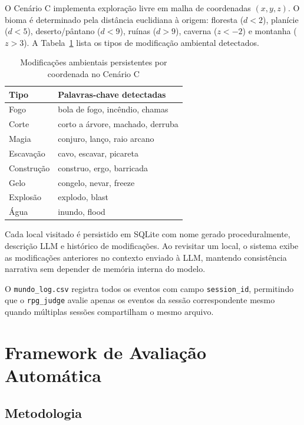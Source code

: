 \documentclass[12pt]{article}
\begin{document}
O Cenário C implementa exploração livre em malha de coordenadas $(x,y,z)$. O bioma é determinado pela distância euclidiana à origem: floresta ($d<2$), planície ($d<5$), deserto/pântano ($d<9$), ruínas ($d>9$), caverna ($z<-2$) e montanha ($z>3$). A Tabela~\ref{tab:modificacoes} lista os tipos de modificação ambiental detectados.

\begin{table}[ht]
\centering
\caption{Modificações ambientais persistentes por coordenada no Cenário C}
\label{tab:modificacoes}
\begin{tabular}{ll}
\toprule
\textbf{Tipo} & \textbf{Palavras-chave detectadas} \\
\midrule
Fogo       & bola de fogo, incêndio, chamas \\
Corte      & corto a árvore, machado, derruba \\
Magia      & conjuro, lanço, raio arcano \\
Escavação  & cavo, escavar, picareta \\
Construção & construo, ergo, barricada \\
Gelo       & congelo, nevar, freeze \\
Explosão   & explodo, blast \\
Água       & inundo, flood \\
\bottomrule
\end{tabular}
\end{table}

Cada local visitado é persistido em SQLite com nome gerado proceduralmente, descrição LLM e histórico de modificações. Ao revisitar um local, o sistema exibe as modificações anteriores no contexto enviado à LLM, mantendo consistência narrativa sem depender de memória interna do modelo.

O \texttt{mundo\_log.csv} registra todos os eventos com campo \texttt{session\_id}, permitindo que o \texttt{rpg\_judge} avalie apenas os eventos da sessão correspondente mesmo quando múltiplas sessões compartilham o mesmo arquivo.

\section{Framework de Avaliação Automática}

\subsection{Metodologia}
\end{document}
